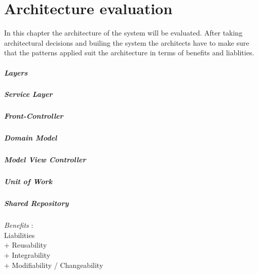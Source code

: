 
\newcommand{\bo}[1]{\textbf{#1}}

\chapter{Architecture evaluation}
\label{ch:evaluation}

In this chapter the architecture of the system will be evaluated. After taking architectural decisions and builing the system the architects have to make sure that the patterns applied suit the architecture in terms of benefits and liablities.

\paragraph{Layers}
\paragraph{Service Layer}
\paragraph{Front-Controller}
\paragraph{Domain Model}
\paragraph{Model View Controller}
\paragraph{Unit of Work}
\paragraph{Shared Repository}
\textit{Benefits} : \\
\textit{} Liabilities \\
+ Reusability \\
+ Integrability \\
+ Modifiability / Changeability \\